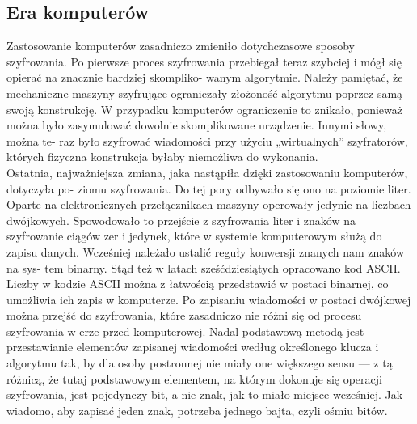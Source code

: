\documentclass[a4paper]{article}
\begin{document}
\subsection{Era komputerów}
Zastosowanie komputerów zasadniczo zmieniło dotychczasowe sposoby szyfrowania. Po pierwsze
proces szyfrowania przebiegał teraz szybciej i mógł się opierać na znacznie bardziej skompliko-
wanym algorytmie. Należy pamiętać, że mechaniczne maszyny szyfrujące ograniczały złożoność
algorytmu poprzez samą swoją konstrukcję. W przypadku komputerów ograniczenie to znikało,
ponieważ można było zasymulować dowolnie skomplikowane urządzenie. Innymi słowy, można te-
raz było szyfrować wiadomości przy użyciu „wirtualnych” szyfratorów, których fizyczna konstrukcja
byłaby niemożliwa do wykonania.\\
Ostatnia, najważniejsza zmiana, jaka nastąpiła dzięki zastosowaniu komputerów, dotyczyła po-
ziomu szyfrowania. Do tej pory odbywało się ono na poziomie liter. Oparte na elektronicznych
przełącznikach maszyny operowały jedynie na liczbach dwójkowych. Spowodowało to przejście z
szyfrowania liter i znaków na szyfrowanie ciągów zer i jedynek, które w systemie komputerowym
służą do zapisu danych. Wcześniej należało ustalić reguły konwersji znanych nam znaków na sys-
tem binarny. Stąd też w latach sześćdziesiątych opracowano kod ASCII.\\
Liczby w kodzie ASCII można z łatwością przedstawić w postaci binarnej, co umożliwia ich zapis
w komputerze. Po zapisaniu wiadomości w postaci dwójkowej można przejść do szyfrowania, które
zasadniczo nie różni się od procesu szyfrowania w erze przed komputerowej. Nadal podstawową
metodą jest przestawianie elementów zapisanej wiadomości według określonego klucza i algorytmu
tak, by dla osoby postronnej nie miały one większego sensu — z tą różnicą, że tutaj podstawowym
elementem, na którym dokonuje się operacji szyfrowania, jest pojedynczy bit, a nie znak, jak to
miało miejsce wcześniej. Jak wiadomo, aby zapisać jeden znak, potrzeba jednego bajta, czyli ośmiu
bitów.
\end{document}
